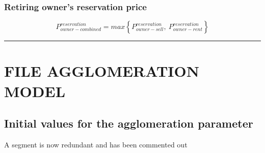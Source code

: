 {\subsubsection{Retiring owner's reservation price}
\[P_{owner-combined}^{reservation}= max\left\{ P_{owner-sell}^{reservation} ,\ P_{owner-rent}^{reservation}\right\}\]

\hrule


\section{FILE AGGLOMERATION MODEL}

\renewcommand{\sfdefault}{phv}

\subsection{Initial values for  the agglomeration parameter}
A segment is now redundant and has been commented out











}
